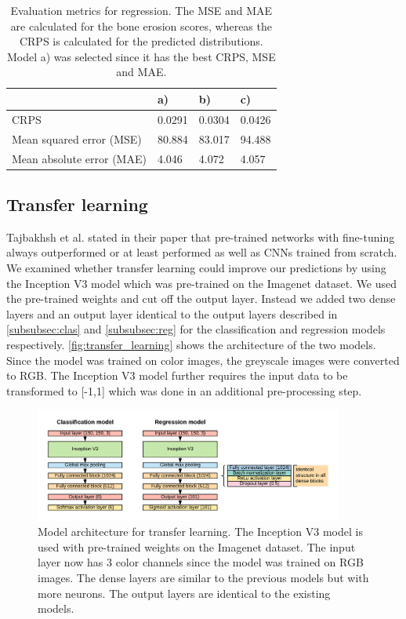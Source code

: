 \documentclass[12pt]{article}
\begin{document}
\begin{table}[ht]
\centering
\caption{Evaluation metrics for regression. The MSE and MAE are calculated for the bone erosion scores, whereas the CRPS is calculated for the predicted distributions. Model a) was selected since it has the best CRPS, MSE and MAE.}
\label{tab:metrics_reg}
\begin{tabular}{@{}llll@{}}
\toprule
                                & a)    & b)    & c)    \\ \midrule
CRPS							& 0.0291 & 0.0304 & 0.0426 \\
Mean squared error (MSE)        & 80.884 & 83.017 & 94.488 \\
Mean absolute error (MAE)       & 4.046 & 4.072 & 4.057 \\

\bottomrule
\end{tabular}
\end{table}

\FloatBarrier

\subsection{Transfer learning}
\label{subsec:transfer_learning}

Tajbakhsh et al. \cite{tajbakhsh_2017} stated in their paper that pre-trained networks with fine-tuning always outperformed or at least performed as well as CNNs trained from scratch. We examined whether transfer learning could improve our predictions by using the Inception V3 model \cite{szegedy_2015} which was pre-trained on the Imagenet dataset. We used the pre-trained weights and cut off the output layer. Instead we added two dense layers and an output layer identical to the output layers described in \autoref{subsubsec:clas} and \autoref{subsubsec:reg} for the classification and regression models respectively. \autoref{fig:transfer_learning} shows the architecture of the two models. Since the model was trained on color images, the greyscale images were converted to RGB. The Inception V3 model further requires the input data to be transformed to [-1,1] which was done in an additional pre-processing step.

\begin{figure}[ht]
\includegraphics[width=4in]{transfer_learning}	
\caption{Model architecture for transfer learning. The Inception V3 model is used with pre-trained weights on the Imagenet dataset. The input layer now has 3 color channels since the model was trained on RGB images. The dense layers are similar to the previous models but with more neurons. The output layers are identical to the existing models.}
\label{fig:transfer_learning}
\end{figure}
\end{document}
